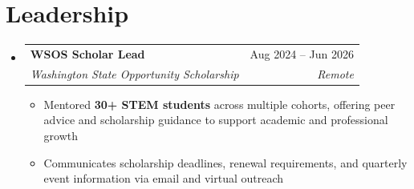\documentclass[letterpaper,11pt]{article}
\makeatletter
\newcommand{\resumeItem}[1]{
  \item\small{
    #1 \vspace{-2pt}
  }
}
\newcommand{\resumeSubheading}[4]{
  \vspace{-2pt}\item
    \begin{tabular*}{0.97\textwidth}[t]{l@{\extracolsep{\fill}}r}
      \textbf{#1} & #2 \\
      \textit{\small#3} & \textit{\small #4} \\
    \end{tabular*}\vspace{-7pt}
}
\newcommand{\resumeSubHeadingListStart}{\begin{itemize}[leftmargin=0.15in, label={}]}
\newcommand{\resumeSubHeadingListEnd}{\end{itemize}}
\newcommand{\resumeItemListStart}{\begin{itemize}}
\newcommand{\resumeItemListEnd}{\end{itemize}\vspace{-5pt}}
\makeatother
\begin{document}
\section{Leadership}
  \resumeSubHeadingListStart

    \resumeSubheading
      {WSOS Scholar Lead}{Aug 2024 -- Jun 2026}
      {Washington State Opportunity Scholarship}{Remote}
      \resumeItemListStart
        \resumeItem{Mentored \textbf{30+ STEM students} across multiple cohorts, offering peer advice and scholarship guidance to support academic and professional growth}
        \resumeItem{Communicates scholarship deadlines, renewal requirements, and quarterly event information via email and virtual outreach}
      \resumeItemListEnd

  \resumeSubHeadingListEnd


\end{document}
